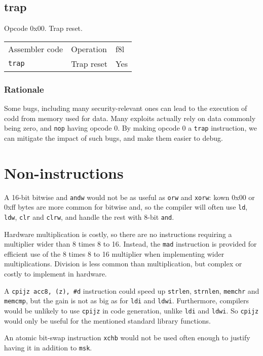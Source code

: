 \documentclass{book}
\begin{document}
\subsection{trap}

Opcode 0x00. Trap reset.

\begin{tabular}{l l l}
Assembler code  & Operation  & f8l \\
\texttt{trap}   & Trap reset & Yes \\
\end{tabular}

\subsubsection*{Rationale}

Some bugs, including many security-relevant ones can lead to the execution of codd from memory used for data. Many exploits actually rely on data commonly being zero, and \texttt{nop} having opcode 0. By making opcode 0 a \texttt{trap} instruction, we can mitigate the impact of such bugs, and make them easier to debug.


\section{Non-instructions}

A 16-bit bitwise and \texttt{andw} would not be as useful as \texttt{orw} and \texttt{xorw}: kown 0x00 or 0xff bytes are more common for bitwise and, so the compiler will often use \texttt{ld}, \texttt{ldw}, \texttt{clr} and \texttt{clrw}, and handle the rest with 8-bit \texttt{and}.

Hardware multiplication is costly, so there are no instructions requiring a multiplier wider than 8 times 8 to 16. Instead, the \texttt{mad} instruction is provided for efficient use of the 8 times 8 to 16 multiplier when implementing wider multiplications. Division is less common than multiplication, but complex or costly to implement in hardware.

A \texttt{cpijz acc8, (z), \#d} instruction could speed up \texttt{strlen}, \texttt{strnlen}, \texttt{memchr} and \texttt{memcmp}, but the gain is not as big as for \texttt{ldi} and \texttt{ldwi}. Furthermore, compilers would be unlikely to use \texttt{cpijz} in code generation, unlike \texttt{ldi} and \texttt{ldwi}. So \texttt{cpijz} would only be useful for the mentioned standard library functions.

An atomic bit-swap instruction \texttt{xchb} would not be used often enough to justify having it in addition to \texttt{msk}.
\end{document}
